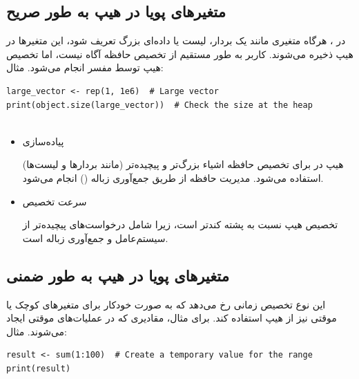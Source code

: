 \documentclass[11pt, a4paper, oneside]{book}
\begin{document}
				
			
			\subsection{متغیرهای پویا در هیپ به طور صریح}
			
				در ، هرگاه متغیری مانند یک بردار، لیست یا داده‌ای بزرگ تعریف شود، این متغیرها در هیپ ذخیره می‌شوند. کاربر به طور مستقیم از تخصیص حافظه آگاه نیست، اما تخصیص هیپ توسط مفسر  انجام می‌شود. مثال:
				
					\begin{latin}
						\begin{lstlisting}[caption={\lr{Dynamic variables on heap explicitly}}] 
large_vector <- rep(1, 1e6)  # Large vector
print(object.size(large_vector))  # Check the size at the heap
							
						\end{lstlisting}
					\end{latin}
					
					\begin{itemize}
						
						\item 
						{\large پیاده‌سازی}
						
						
						هیپ در  برای تخصیص حافظه اشیاء بزرگ‌تر و پیچیده‌تر (مانند بردارها و لیست‌ها) استفاده می‌شود.
						مدیریت حافظه از طریق جمع‌آوری زباله () انجام می‌شود.
						
						
						\item 
						{\large سرعت تخصیص}
						
						
						تخصیص هیپ نسبت به پشته کندتر است، زیرا شامل درخواست‌های پیچیده‌تر از سیستم‌عامل و جمع‌آوری زباله است.
						
					\end{itemize}
			
			\subsection{متغیرهای پویا در هیپ به طور ضمنی}
			
				این نوع تخصیص زمانی رخ می‌دهد که  به صورت خودکار برای متغیرهای کوچک یا موقتی نیز از هیپ استفاده کند. برای مثال، مقادیری که در عملیات‌های موقتی ایجاد می‌شوند. مثال:
				
					\begin{latin}
						\begin{lstlisting}[caption={\lr{Dynamic variables on heap implicitly}}] 
result <- sum(1:100)  # Create a temporary value for the range
print(result)

						\end{lstlisting}
					\end{latin}
					
\end{document}
